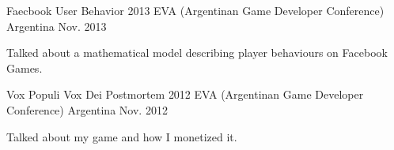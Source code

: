 

\begin{cventries}

  \cventry
    {Faecbook User Behavior} %
    {2013 EVA (Argentinan Game Developer Conference)} %
    {Argentina} %
    {Nov. 2013} %
    {
      \begin{cvitems} %
         \item {Talked about a mathematical model describing player behaviours on Facebook Games.}
      \end{cvitems}
    }

 \cventry
    {Vox Populi Vox Dei Postmortem} %
    {2012 EVA (Argentinan Game Developer Conference)} %
    {Argentina} %
    {Nov. 2012} %
    {
      \begin{cvitems} %
        \item {Talked about my game and how I monetized it.}
      \end{cvitems}
    }

\end{cventries}
